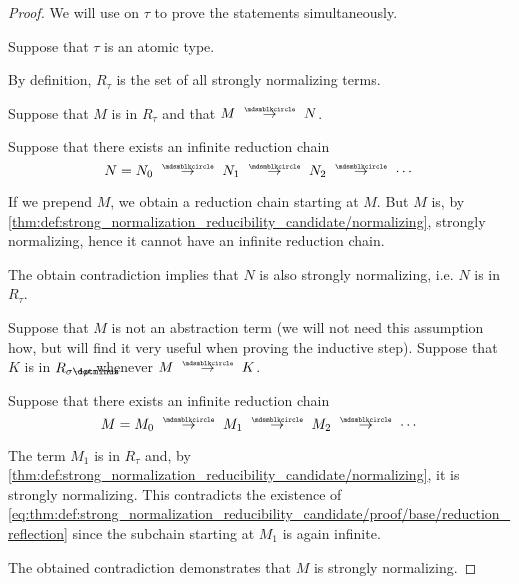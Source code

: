 \begin{proof}
  We will use  on \( \tau \) to prove the statements simultaneously.

   Suppose that \( \tau \) is an atomic type.

   By definition, \( R_\tau \) is the set of all strongly normalizing terms.

   Suppose that \( M \) is in \( R_\tau \) and that \( M \pred N \).

  Suppose that there exists an infinite reduction chain
  \begin{equation*}
    N = N_0 \pred N_1 \pred N_2 \pred \cdots
  \end{equation*}

  If we prepend \( M \), we obtain a reduction chain starting at \( M \). But \( M \) is, by \ref{thm:def:strong_normalization_reducibility_candidate/normalizing}, strongly normalizing, hence it cannot have an infinite reduction chain.

  The obtain contradiction implies that \( N \) is also strongly normalizing, i.e. \( N \) is in \( R_\tau \).

   Suppose that \( M \) is not an abstraction term (we will not need this assumption how, but will find it very useful when proving the inductive step). Suppose that \( K \) is in \( R_{\sigma \synimplies \rho} \) whenever \( M \pred K \).

  Suppose that there exists an infinite reduction chain
  \begin{equation}\label{eq:thm:def:strong_normalization_reducibility_candidate/proof/base/reduction_reflection}
    M = M_0 \pred M_1 \pred M_2 \pred \cdots
  \end{equation}

  The term \( M_1 \) is in \( R_\tau \) and, by \ref{thm:def:strong_normalization_reducibility_candidate/normalizing}, it is strongly normalizing. This contradicts the existence of \eqref{eq:thm:def:strong_normalization_reducibility_candidate/proof/base/reduction_reflection} since the subchain starting at \( M_1 \) is again infinite.

  The obtained contradiction demonstrates that \( M \) is strongly normalizing.


\end{proof}
